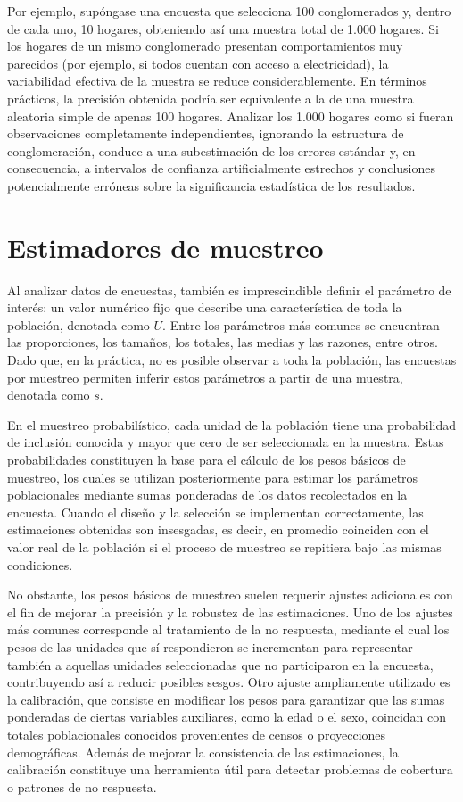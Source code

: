 \documentclass[
  spanish,
  12pt,
]{book}
\begin{document}
Por ejemplo, supóngase una encuesta que selecciona 100 conglomerados y, dentro de cada uno, 10 hogares, obteniendo así una muestra total de 1.000 hogares. Si los hogares de un mismo conglomerado presentan comportamientos muy parecidos (por ejemplo, si todos cuentan con acceso a electricidad), la variabilidad efectiva de la muestra se reduce considerablemente. En términos prácticos, la precisión obtenida podría ser equivalente a la de una muestra aleatoria simple de apenas 100 hogares. Analizar los 1.000 hogares como si fueran observaciones completamente independientes, ignorando la estructura de conglomeración, conduce a una subestimación de los errores estándar y, en consecuencia, a intervalos de confianza artificialmente estrechos y conclusiones potencialmente erróneas sobre la significancia estadística de los resultados.

\section{Estimadores de muestreo}\label{estimadores-de-muestreo}

Al analizar datos de encuestas, también es imprescindible definir el parámetro de interés: un valor numérico fijo que describe una característica de toda la población, denotada como \(U\). Entre los parámetros más comunes se encuentran las proporciones, los tamaños, los totales, las medias y las razones, entre otros. Dado que, en la práctica, no es posible observar a toda la población, las encuestas por muestreo permiten inferir estos parámetros a partir de una muestra, denotada como \(s\).

En el muestreo probabilístico, cada unidad de la población tiene una probabilidad de inclusión conocida y mayor que cero de ser seleccionada en la muestra. Estas probabilidades constituyen la base para el cálculo de los pesos básicos de muestreo, los cuales se utilizan posteriormente para estimar los parámetros poblacionales mediante sumas ponderadas de los datos recolectados en la encuesta. Cuando el diseño y la selección se implementan correctamente, las estimaciones obtenidas son insesgadas, es decir, en promedio coinciden con el valor real de la población si el proceso de muestreo se repitiera bajo las mismas condiciones.

No obstante, los pesos básicos de muestreo suelen requerir ajustes adicionales con el fin de mejorar la precisión y la robustez de las estimaciones. Uno de los ajustes más comunes corresponde al tratamiento de la no respuesta, mediante el cual los pesos de las unidades que sí respondieron se incrementan para representar también a aquellas unidades seleccionadas que no participaron en la encuesta, contribuyendo así a reducir posibles sesgos. Otro ajuste ampliamente utilizado es la calibración, que consiste en modificar los pesos para garantizar que las sumas ponderadas de ciertas variables auxiliares, como la edad o el sexo, coincidan con totales poblacionales conocidos provenientes de censos o proyecciones demográficas. Además de mejorar la consistencia de las estimaciones, la calibración constituye una herramienta útil para detectar problemas de cobertura o patrones de no respuesta.
\end{document}
